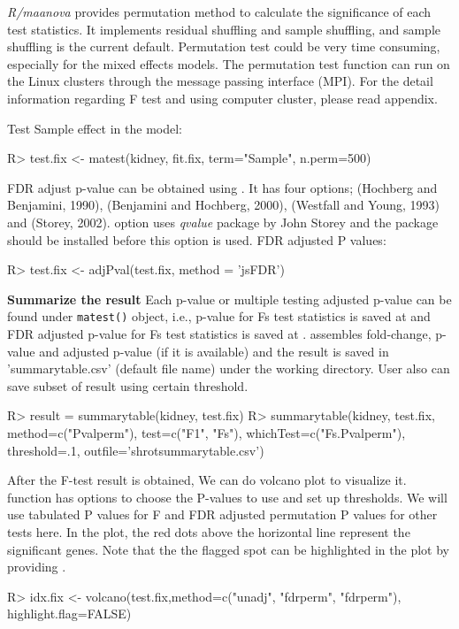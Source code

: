 {\em R/maanova} provides permutation method to calculate the significance of
each test statistics. It implements residual shuffling and sample shuffling,
and sample shuffling is the current default. Permutation test could be very
time consuming, especially for the mixed effects models. The permutation
test function can run on the Linux clusters through the message passing 
interface (MPI). For the detail information regarding F test and 
using computer cluster, please read appendix. 

Test Sample effect in the model:
\begin{Sinput}
R> test.fix <- matest(kidney, fit.fix, term="Sample", n.perm=500)
\end{Sinput}

FDR adjust p-value can be obtained using . It has four
  options;   (Hochberg and Benjamini, 1990),  (Benjamini and Hochberg, 2000), 
  (Westfall and Young, 1993) and  (Storey,
  2002).  option uses {\em qvalue} package by John
  Storey and the package should be installed before this option
  is used. FDR adjusted P values:
\begin{Sinput}
R> test.fix <- adjPval(test.fix, method = 'jsFDR')
\end{Sinput}
{\bf Summarize the result} Each p-value or multiple testing adjusted p-value
can be found under {\tt matest()} object, i.e., p-value for Fs test statistics is
saved at  and FDR adjusted p-value for Fs
test statistics is saved at .  assembles
fold-change, p-value and adjusted p-value (if it is available) and the result
is saved in 'summarytable.csv' (default file name) under the working directory. User also can save subset of result using certain threshold.  
\begin{Sinput}
R> result = summarytable(kidney, test.fix)
R> summarytable(kidney, test.fix, method=c("Pvalperm"), test=c("F1", "Fs"),
whichTest=c("Fs.Pvalperm"), threshold=.1, outfile='shrotsummarytable.csv')
\end{Sinput}

After the F-test result is obtained, We can do volcano plot
to visualize it.  function has options to 
choose the P-values to use and set up thresholds. We will
use tabulated P values for F and FDR adjusted permutation 
P values for other tests here. 
In the plot, the red dots above the horizontal line represent
the significant genes. 
Note that the the flagged spot can be highlighted in the plot by providing .
\begin{Sinput}
R> idx.fix <- volcano(test.fix,method=c("unadj", "fdrperm", "fdrperm"),
         highlight.flag=FALSE)
\end{Sinput}

